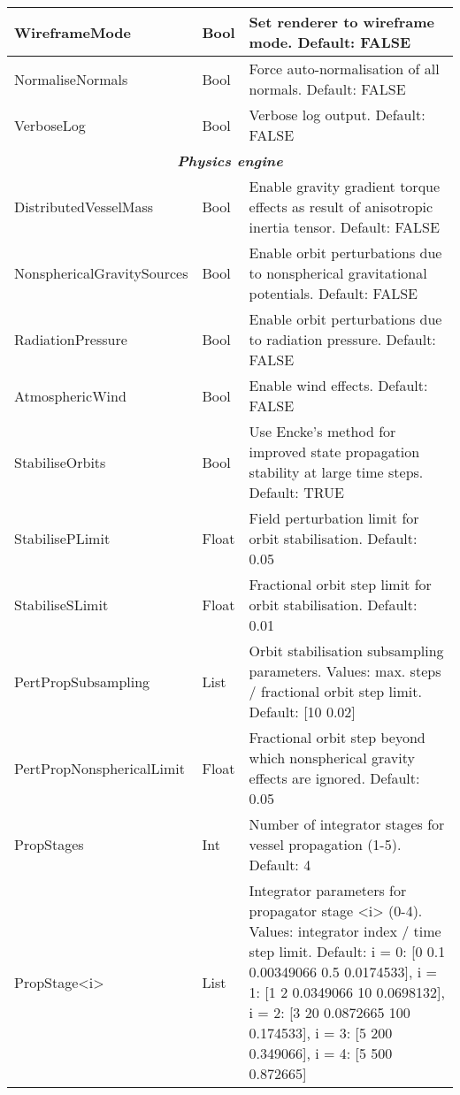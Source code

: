 \documentclass[Orbiter User Manual.tex]{subfiles}
\begin{document}
\begin{longtable}{ |p{}|p{}|p{}| }
	\hline\rule{0pt}{2ex}
	WireframeMode & Bool & Set renderer to wireframe mode. Default: FALSE\\
	\hline\rule{0pt}{2ex}
	NormaliseNormals & Bool & Force auto-normalisation of all normals. Default: FALSE\\
	\hline\rule{0pt}{2ex}
	VerboseLog & Bool & Verbose log output. Default: FALSE\\
	\hline
	\multicolumn{3}{|c|}{\rule{0pt}{2ex}\textbf{\textit{Physics engine}}}\\
	\hline\rule{0pt}{2ex}
	DistributedVesselMass & Bool & Enable gravity gradient torque effects as result of anisotropic inertia tensor. Default: FALSE\\
	\hline\rule{0pt}{2ex}
	NonsphericalGravitySources & Bool & Enable orbit perturbations due to nonspherical gravitational potentials. Default: FALSE\\
	\hline\rule{0pt}{2ex}
	RadiationPressure & Bool & Enable orbit perturbations due to radiation pressure. Default: FALSE\\
	\hline\rule{0pt}{2ex}
	AtmosphericWind & Bool & Enable wind effects. Default: FALSE\\
	\hline\rule{0pt}{2ex}
	StabiliseOrbits & Bool & Use Encke's method for improved state propagation stability at large time steps. Default: TRUE\\
	\hline\rule{0pt}{2ex}
	StabilisePLimit & Float & Field perturbation limit for orbit stabilisation. Default: 0.05\\
	\hline\rule{0pt}{2ex}
	StabiliseSLimit & Float & Fractional orbit step limit for orbit stabilisation. Default: 0.01\\
	\hline\rule{0pt}{2ex}
	PertPropSubsampling & List & Orbit stabilisation subsampling parameters. Values: max. steps / fractional orbit step limit. Default: [10 0.02]\\
	\hline\rule{0pt}{2ex}
	PertPropNonsphericalLimit & Float & Fractional orbit step beyond which nonspherical gravity effects are ignored. Default: 0.05\\
	\hline\rule{0pt}{2ex}
	PropStages & Int & Number of integrator stages for vessel propagation (1-5). Default: 4\\
	\hline\rule{0pt}{2ex}
	PropStage<i> & List & Integrator parameters for propagator stage <i> (0-4). Values: integrator index / time step limit. Default: i = 0: [0 0.1 0.00349066 0.5 0.0174533], i = 1: [1 2 0.0349066 10 0.0698132], i = 2: [3 20 0.0872665 100 0.174533], i = 3: [5 200 0.349066], i = 4: [5 500 0.872665]\\

\end{longtable}
\end{document}
